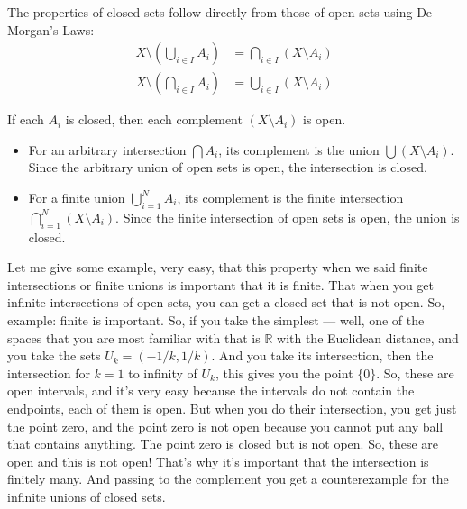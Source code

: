 \begin{math-stroke}
The properties of closed sets follow directly from those of open sets using De Morgan's Laws:
\begin{align*}
X \setminus \left( \bigcup_{i \in I} A_i \right) &= \bigcap_{i \in I} (X \setminus A_i) \\
X \setminus \left( \bigcap_{i \in I} A_i \right) &= \bigcup_{i \in I} (X \setminus A_i)
\end{align*}
\begin{explanation-of-steps}
If each $A_i$ is closed, then each complement $(X \setminus A_i)$ is open. 
\begin{itemize}
    \item For an arbitrary intersection $\bigcap A_i$, its complement is the union $\bigcup (X \setminus A_i)$. Since the arbitrary union of open sets is open, the intersection is closed.
    \item For a finite union $\bigcup_{i=1}^N A_i$, its complement is the finite intersection $\bigcap_{i=1}^N (X \setminus A_i)$. Since the finite intersection of open sets is open, the union is closed.
\end{itemize}
\end{explanation-of-steps}
\end{math-stroke}


\begin{spoken-clean}[00:24:04 - 00:26:39]
Let me give some example, very easy, that this property when we said finite intersections or finite unions is important that it is finite. That when you get infinite intersections of open sets, you can get a closed set that is not open. So, example: finite is important. So, if you take the simplest --- well, one of the spaces that you are most familiar with that is $\mathbb{R}$ with the Euclidean distance, and you take the sets $U_k = (-1/k, 1/k)$. And you take its intersection, then the intersection for $k=1$ to infinity of $U_k$, this gives you the point $\{0\}$. So, these are open intervals, and it's very easy because the intervals do not contain the endpoints, each of them is open. But when you do their intersection, you get just the point zero, and the point zero is not open because you cannot put any ball that contains anything. The point zero is closed but is not open. So, these are open and this is not open! That's why it's important that the intersection is finitely many. And passing to the complement you get a counterexample for the infinite unions of closed sets.
\end{spoken-clean}


